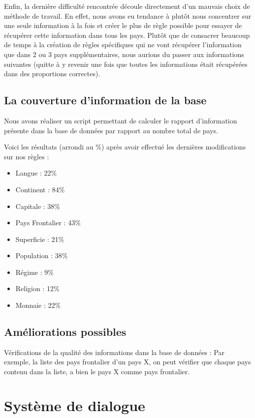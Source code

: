 \documentclass[11pt,a4paper]{article}
\begin{document}
Enfin, la dernière difficulté rencontrée découle directement d'un mauvais choix de méthode de travail.
En effet, nous avons eu tendance à plutôt nous concentrer sur une seule information à la fois et créer le plus de règle possible pour essayer de récupérer cette information dans tous les pays.
Plutôt que de consacrer beaucoup de temps à la création de règles spécifiques qui ne vont récupérer l'information que dans 2 ou 3 pays supplémentaires, nous aurions du passer aux informations suivantes (quitte à y revenir une fois que toutes les informations était récupérées dans des proportions correctes).

\subsection{La couverture d'information de la base}
Nous avons réaliser un script permettant de calculer le rapport d'information présente dans la base de données par rapport au nombre total de pays.

Voici les résultats (arrondi au \%) après avoir effectué les dernières modifications sur nos règles :
\begin{itemize}
	\item Langue 		  : 22\%
	\item Continent 	  : 84\%
	\item Capitale 		  : 38\%
	\item Pays Frontalier : 43\%
	\item Superficie	  : 21\%
	\item Population 	  : 38\%
	\item Régime 		  : 9\%
	\item Religion		  : 12\%
	\item Monnaie		  : 22\%
\end{itemize}

  


\subsection{Améliorations possibles}
Vérifications de la qualité des informations dans la base de données :
Par exemple, la liste des pays frontalier d'un pays X, on peut vérifier que chaque pays contenu dans la liste, a bien le pays X comme pays frontalier.

\clearpage

\section{Système de dialogue}
\end{document}
